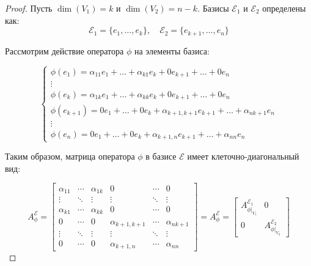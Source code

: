 \begin{proof}
\leavevmode \nl 

Пусть \(\dim(V_{1}) = k\) и \(\dim(V_{2}) = n-k\). Базисы \(\mathcal{E}_{1}\) и \(\mathcal{E}_{2}\) определены как:
\[
\mathcal{E}_{1} = \{ e_1, \ldots, e_k \}, \quad \mathcal{E}_{2} = \{ e_{k+1}, \ldots, e_n \}
\]

Рассмотрим действие оператора \(\phi\) на элементы базиса:

\[
\begin{cases}
\phi(e_1) = \alpha_{11} e_1 + \ldots + \alpha_{k1} e_k + 0 e_{k+1} + \ldots + 0 e_n \\
\vdots \\
\phi(e_k) = \alpha_{1k} e_1 + \ldots + \alpha_{kk} e_k + 0 e_{k+1} + \ldots + 0 e_n \\
\phi(e_{k+1}) = 0 e_1 + \ldots + 0 e_k + \alpha_{k+1,k+1} e_{k+1} + \ldots + \alpha_{nk+1} e_n \\
\vdots \\
\phi(e_n) = 0 e_1 + \ldots + 0 e_k + \alpha_{k+1,n} e_{k+1} + \ldots + \alpha_{nn} e_n
\end{cases}
\]

Таким образом, матрица оператора \(\phi\) в базисе \(\mathcal{E}\) имеет клеточно-диагональный вид:

\[
A_{\phi}^{\mathcal{E}} = \begin{bmatrix}
\alpha_{11} & \cdots & \alpha_{1k} & 0 & \cdots & 0 \\
\vdots & \ddots & \vdots & \vdots & \ddots & \vdots \\
\alpha_{k1} & \cdots & \alpha_{kk} & 0 & \cdots & 0 \\
0 & \cdots & 0 & \alpha_{k+1,k+1} & \cdots & \alpha_{nk+1} \\
\vdots & \ddots & \vdots & \vdots & \ddots & \vdots \\
0 & \cdots & 0 & \alpha_{k+1,n} & \cdots & \alpha_{nn}
\end{bmatrix} = 
A_{\phi}^{\mathcal{E}} = \begin{bmatrix}
A_{\phi|_{V_{1}}}^{\mathcal{E}_{1}} & 0 \\
0 & A_{\phi|_{V_{2}}}^{\mathcal{E}_{2}}
\end{bmatrix}
\]
\end{proof}

